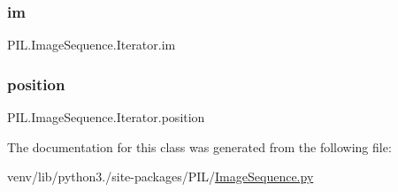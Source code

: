 \subsubsection{\texorpdfstring{im}{im}}
{\footnotesize\ttfamily P\+I\+L.\+Image\+Sequence.\+Iterator.\+im}

\mbox{\label{classPIL_1_1ImageSequence_1_1Iterator_a5642701505b3da9045e6a1eb3257f10d}} 
\subsubsection{\texorpdfstring{position}{position}}
{\footnotesize\ttfamily P\+I\+L.\+Image\+Sequence.\+Iterator.\+position}



The documentation for this class was generated from the following file\+:\begin{DoxyCompactItemize}
\item 
venv/lib/python3./site-\/packages/\+P\+I\+L/\hyperlink{ImageSequence_8py}{Image\+Sequence.\+py}\end{DoxyCompactItemize}
